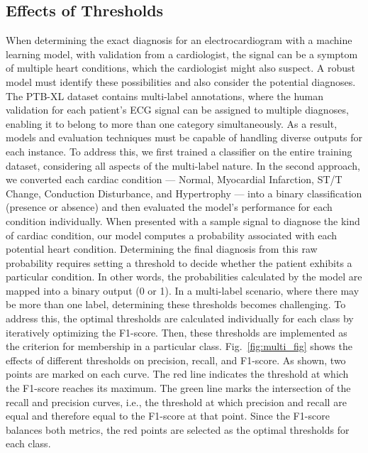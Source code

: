 \documentclass[a4paper,fleqn]{cas-dc}
\begin{document}
\subsection{Effects of Thresholds}
When determining the exact diagnosis for an electrocardiogram with a machine learning model, with validation from a cardiologist, the signal can be a symptom of multiple heart conditions, which the cardiologist might also suspect. A robust model must identify these possibilities and also consider the potential diagnoses. The PTB-XL dataset contains multi-label annotations, where the human validation for each patient's ECG signal can be assigned to multiple diagnoses, enabling it to belong to more than one category simultaneously. As a result, models and evaluation techniques must be capable of handling diverse outputs for each instance. To address this, we first trained a classifier on the entire training dataset, considering all aspects of the multi-label nature. In the second approach, we converted each cardiac condition --- Normal, Myocardial Infarction, ST/T Change, Conduction Disturbance, and Hypertrophy --- into a binary classification (presence or absence) and then evaluated the model's performance for each condition individually. When presented with a sample signal to diagnose the kind of cardiac condition, our model computes a probability associated with each potential heart condition. Determining the final diagnosis from this raw probability requires setting a threshold to decide whether the patient exhibits a particular condition. In other words, the probabilities calculated by the model are mapped into a binary output (0 or 1). In a multi-label scenario, where there may be more than one label, determining these thresholds becomes challenging. To address this, the optimal thresholds are calculated individually for each class by iteratively optimizing the F1-score. Then, these thresholds are implemented as the criterion for membership in a particular class. Fig.~\ref{fig:multi_fig} shows the effects of different thresholds on precision, recall, and F1-score. As shown, two points are marked on each curve. The red line indicates the threshold at which the F1-score reaches its maximum. The green line marks the intersection of the recall and precision curves, i.e., the threshold at which precision and recall are equal and therefore equal to the F1-score at that point. Since the F1-score balances both metrics, the red points are selected as the optimal thresholds for each class.
\end{document}
